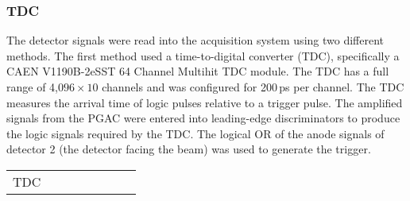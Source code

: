\subsubsection{TDC}The detector signals were read into the acquisition system using two different methods.  The first method used a time-to-digital converter (TDC), specifically a CAEN V1190B-2eSST 64 Channel Multihit TDC module.  The TDC has a full range of 4,0$96 \times 10$ channels and was configured for 200\,ps per channel. The TDC measures the arrival time of logic pulses relative to a trigger pulse.   The amplified signals from the PGAC were entered into leading-edge discriminators to produce the logic signals required by the TDC.  The logical OR of the anode signals of detector 2 (the detector facing the beam) was used to generate the trigger.
\begin{table}%

\begin{minipage}{\textwidth}
\begin{center}
  

%
%
\begin{tabular}{rrr|rrcc|cc}
\hline

\multicolumn{2}{c}{TDC} & %


\end{tabular}
\end{center}
\end{minipage}
\end{table}
